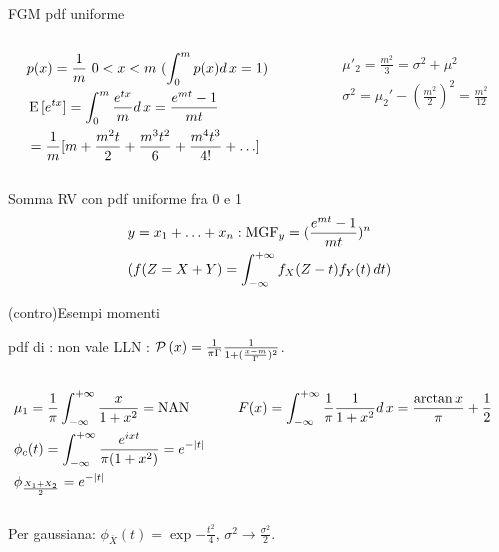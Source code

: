\documentclass[asd-beamer.tex]{subfiles}%
\begin{document}
\begin{wordonframe}{FGM pdf uniforme}
\begin{columns}[T]
\begin{column}{0.5\textwidth}
\begin{align*}
&p(x)=\frac{1}{m}\ 0<x<m\ (\int_0^mp(x)d\,x=1)\\
&\operatorname{E}{[e^{tx}]}=\int_0^m\frac{e^{tx}}{m}d\,x=\frac{e^{mt}-1}{mt}\\
&=\frac{1}{m}[m+\frac{m^2t}{2}+\frac{m^3t^2}{6}+\frac{m^4t^3}{4!}+\ldots]
\end{align*}
\end{column}
\begin{column}{0.5\textwidth}
\begin{align*}
&\mu'_2=\frac{m^2}{3}=\sigma^2+\mu^2\\
&\sigma^2=\mu_2'-(\frac{m^2}{2})^2=\frac{m^2}{12}
\end{align*}
\end{column}
\end{columns}
\begin{block}{Somma RV con pdf uniforme fra 0 e 1}
\begin{align*}
&y=x_1+\ldots+x_n: \operatorname{MGF}_y=(\frac{e^{mt}-1}{mt})^n\\
&(f(Z=X+Y)=\int_{-\infty}^{+\infty}{}f_X(Z-t)f_Y(t)\,dt)
\end{align*}
\end{block}
\end{wordonframe}

\begin{wordonframe}{(contro)Esempi momenti}
\begin{block}{pdf di : non vale LLN}
: $\operatorname{\mathcal{P}}{(x)}=\frac{1}{\pi\Gamma}\frac{1}{1+(\frac{x-m}{\Gamma})^2}$.
\begin{columns}[T]
\begin{column}{0.5\textwidth}
\begin{align*}
&\mu_1=\frac{1}{\pi}\int_{-\infty}^{+\infty}{}\frac{x}{1+x^2}=\operatorname{NAN}{}\\
&\phi_c(t)=\int_{-\infty}^{+\infty}{}\frac{e^{ixt}}{\pi(1+x^2)}=e^{-|t|}\\
&\phi_{\frac{X_1+X_2}{2}}=e^{-|t|}
\end{align*}
\end{column}
\begin{column}{0.5\textwidth}
\begin{align*}
&F(x)=\int_{-\infty}^{+\infty}{}\frac{1}{\pi}\frac{1}{1+x^2}d\,x=\frac{\arctan{x}}{\pi}+\frac{1}{2}
\end{align*}
\end{column}
\end{columns}
Per gaussiana: $\phi_{\overline{X}}(t)=\exp{-\frac{t^2}{4}}$, $\sigma^2\to\frac{\sigma^2}{2}$.
\end{block}
\end{wordonframe}
\end{document}
